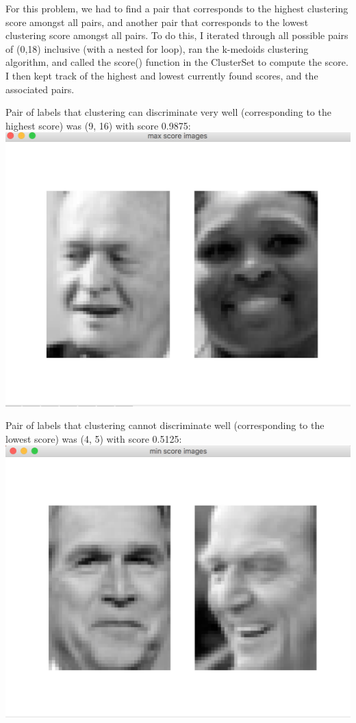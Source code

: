 \documentclass[11pt]{article}
\newcommand{\solution}[1]{{{\color{blue}{\bf Solution:} {#1}}}}
\begin{document}
\solution{
For this problem, we had to find a pair that corresponds to the highest clustering score amongst all pairs, and another pair that corresponds to the lowest clustering score amongst all pairs. To do this, I iterated through all possible pairs of (0,18) inclusive (with a nested for loop), ran the k-medoids clustering algorithm, and called the score() function in the ClusterSet to compute the score. I then kept track of the highest and lowest currently found scores, and the associated pairs. 
\newline{}

Pair of labels that clustering can discriminate very well (corresponding to the highest score) was (9, 16) with score 0.9875: \newline{}
\includegraphics[scale = 0.6]{max-score-image.png} \newline{}

Pair of labels that clustering cannot discriminate well (corresponding to the lowest score) was (4, 5) with score 0.5125: \newline{}
\includegraphics[scale = 0.6]{min-score-image.png}

}
\end{document}
